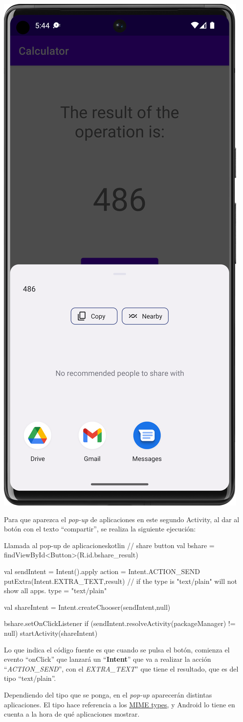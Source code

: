 \documentclass{\ClassPath/viu-tfm-template}
\begin{document}
\begin{center}
    \includegraphics[width=0.4\linewidth]{img/share.png}
\end{center}



Para que aparezca el \textit{pop-up} de aplicaciones en este segundo Activity, al dar al botón con el texto “compartir”, se realiza la siguiente ejecución:

\begin{mycode}{Llamada al pop-up de aplicaciones}{kotlin}{}
// share button
val bshare = findViewById<Button>(R.id.bshare_result)

val sendIntent = Intent().apply {
    action = Intent.ACTION_SEND
    putExtra(Intent.EXTRA_TEXT,result)
    // if the type is "text/plain" will not show all apps.
    type = "text/plain"
}

val shareIntent = Intent.createChooser(sendIntent,null)

bshare.setOnClickListener {
    if (sendIntent.resolveActivity(packageManager) != null) {
        startActivity(shareIntent)
    }
}
\end{mycode}

Lo que indica el código fuente es que cuando se pulsa el botón, comienza el evento “onClick” que lanzará un “\textbf{Intent}” que va a realizar la acción “\textit{ACTION\_SEND}”, con el \textit{EXTRA\_TEXT}” que tiene el resultado, que es del tipo “text/plain”.

Dependiendo del tipo que se ponga, en el \textit{pop-up} aparecerán distintas aplicaciones. El tipo hace referencia a los \href{https://en.wikipedia.org/wiki/Media_type}{MIME types}, y Android lo tiene en cuenta a la hora de qué aplicaciones mostrar.
\end{document}
